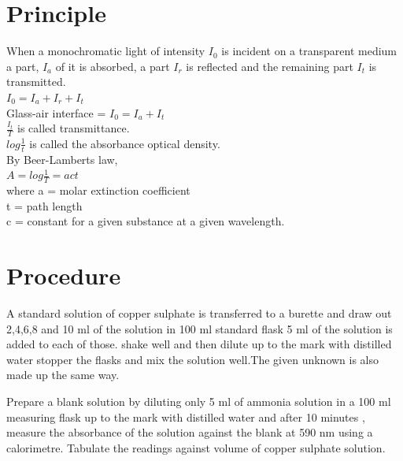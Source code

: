 \documentclass{report}
\begin{document}
\section*{Principle}
When a monochromatic light of intensity $I_0$ is incident on a transparent medium a part, $I_a$ of it is absorbed, a part $I_r$ is reflected and the remaining part $I_t$ is transmitted.\\$I_0 = I_a+I_r+I_t$\\Glass-air interface = $I_0=I_a+I_t$\\$\frac{I_t}{T}$ is called transmittance.\\$log\frac{1}{t}$ is called the absorbance optical density.\\By Beer-Lamberts law,\\$A = log\frac{1}{T}=act$\\ where a = molar extinction coefficient\\t = path length\\c = constant for a given substance at a given wavelength.
\section*{Procedure}

A standard solution of copper sulphate is transferred to a burette and draw out 2,4,6,8 and 10 ml of the solution in 100 ml standard flask 5 ml of the solution is added to each of those. shake well and then dilute up to the mark with distilled water stopper the flasks and mix the solution well.The given unknown is also made up the same way.

Prepare a blank solution by diluting only 5 ml of ammonia solution in a 100 ml measuring flask up to the mark with distilled water and after 10 minutes , measure the absorbance of the solution against the blank at 590 nm using a calorimetre. Tabulate the readings against volume of copper sulphate solution.
\end{document}
